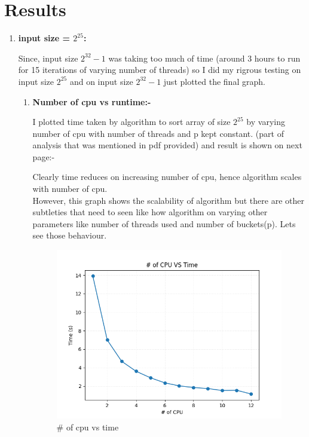 \documentclass{article}
\begin{document}
\section{Results}


\begin{enumerate}
    \item \textbf{input size = $2^{25}$: }
    
    Since, input size $2^{32}-1$ was taking too much of time (around 3 hours to run for 15 iterations of varying number of threads) 
    so I did my rigrous testing on input size $2^{25}$ and on input size $2^{32}-1$ just plotted the final graph.
    
    \begin{enumerate}

        \item \textbf{Number of cpu vs runtime:- }
        
        I plotted time taken by algorithm to sort array of size $2^{25}$ by varying number of cpu with number of threads and p kept constant. 
        (part of analysis that was mentioned in pdf provided) and result is shown on next page:- 

        Clearly time reduces on increasing number of cpu, hence algorithm scales with number of cpu.\\
        However, this graph shows the scalability of algorithm but there are other subtleties that need to 
        seen like how algorithm on varying other parameters like number of threads used and number of buckets(p). Lets see
        those behaviour.

        \begin{figure}[H]
            \centering
            \includegraphics[width=10cm]{../graph.png}
            \caption{\# of cpu vs time}
        \end{figure}



\end{enumerate}
\end{enumerate}
\end{document}
